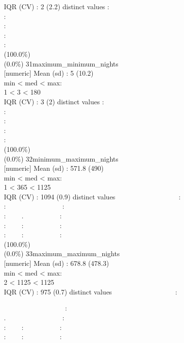 \documentclass[
  journal,
]{IEEEtran}%
\begin{document}
IQR (CV) : 2 (2.2)  distinct values \textbar{} \textbar:\\
:\\
:\\
:\\
: \\
(100.0\%) \\
(0.0\%) \textbar{} \textbar{} 31\textbar maximum\_minimum\_nights\\
{[}numeric{]} \textbar Mean (sd) : 5 (10.2)\\
min \textless{} med \textless{} max:\\
1 \textless{} 3 \textless{} 180\\
IQR (CV) : 3 (2)  distinct values \textbar{} \textbar:\\
:\\
:\\
:\\
: \\
(100.0\%) \\
(0.0\%) \textbar{} \textbar{} 32\textbar minimum\_maximum\_nights\\
{[}numeric{]} \textbar Mean (sd) : 571.8 (490)\\
min \textless{} med \textless{} max:\\
1 \textless{} 365 \textless{} 1125\\
IQR (CV) : 1094 (0.9)  distinct values \textbar{}
\textbar~~~~~~~~~~~~~~~~~~:\\
: ~~~~~~~~~~~~~~~~:\\
: ~~~~. ~~~~~~~~~~:\\
: ~~~~: ~~~~~~~~~~:\\
: ~~~~: ~~~~~~~~~~: \\
(100.0\%) \\
(0.0\%) \textbar{} \textbar{} 33\textbar maximum\_maximum\_nights\\
{[}numeric{]} \textbar Mean (sd) : 678.8 (478.3)\\
min \textless{} med \textless{} max:\\
2 \textless{} 1125 \textless{} 1125\\
IQR (CV) : 975 (0.7)  distinct values \textbar{}
\textbar~~~~~~~~~~~~~~~~~~:\\
\strut ~~~~~~~~~~~~~~~~~~:\\
. ~~~~~~~~~~~~~~~~:\\
: ~~~~: ~~~~~~~~~~:\\
: ~~~~: ~~~~~~~~~~: \\
\end{document}
